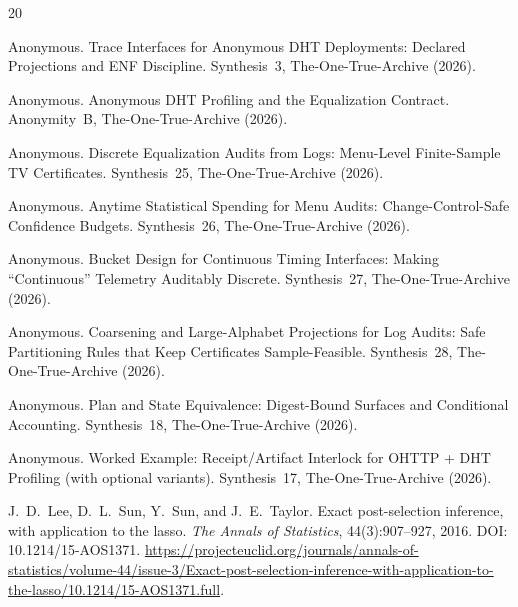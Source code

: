 \documentclass[11pt]{article}
\begin{document}

\begin{thebibliography}{20}

Anonymous.
\newblock Trace Interfaces for Anonymous DHT Deployments: Declared Projections and ENF Discipline.
\newblock Synthesis~3, The-One-True-Archive (2026).

Anonymous.
\newblock Anonymous DHT Profiling and the Equalization Contract.
\newblock Anonymity~B, The-One-True-Archive (2026).

Anonymous.
\newblock Discrete Equalization Audits from Logs: Menu-Level Finite-Sample TV Certificates.
\newblock Synthesis~25, The-One-True-Archive (2026).

Anonymous.
\newblock Anytime Statistical Spending for Menu Audits: Change-Control-Safe Confidence Budgets.
\newblock Synthesis~26, The-One-True-Archive (2026).

Anonymous.
\newblock Bucket Design for Continuous Timing Interfaces: Making ``Continuous'' Telemetry Auditably Discrete.
\newblock Synthesis~27, The-One-True-Archive (2026).

Anonymous.
\newblock Coarsening and Large-Alphabet Projections for Log Audits: Safe Partitioning Rules that Keep Certificates Sample-Feasible.
\newblock Synthesis~28, The-One-True-Archive (2026).

Anonymous.
\newblock Plan and State Equivalence: Digest-Bound Surfaces and Conditional Accounting.
\newblock Synthesis~18, The-One-True-Archive (2026).

Anonymous.
\newblock Worked Example: Receipt/Artifact Interlock for OHTTP + DHT Profiling (with optional variants).
\newblock Synthesis~17, The-One-True-Archive (2026).



J.~D.~Lee, D.~L.~Sun, Y.~Sun, and J.~E.~Taylor.
\newblock Exact post-selection inference, with application to the lasso.
\newblock \emph{The Annals of Statistics}, 44(3):907--927, 2016.
\newblock DOI: 10.1214/15-AOS1371.
\newblock \url{https://projecteuclid.org/journals/annals-of-statistics/volume-44/issue-3/Exact-post-selection-inference-with-application-to-the-lasso/10.1214/15-AOS1371.full}.

\end{thebibliography}
\end{document}
